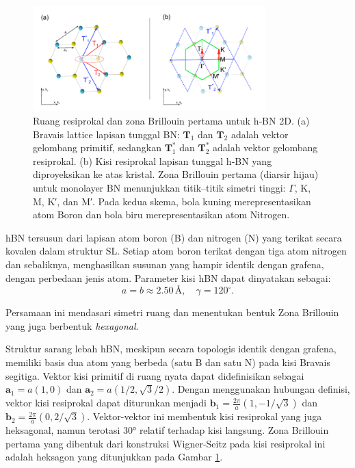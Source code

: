 \begin{figure}[ht]
    \centering
    \includegraphics[width=0.8\textwidth]{gambar/hBN_structure_brillouinzone}
    \caption{Ruang resiprokal dan zona Brillouin pertama untuk h‑BN 2D.
(a) Bravais lattice lapisan tunggal BN: $\mathbf{T}_1$ dan $\mathbf{T}_2$ adalah vektor gelombang primitif, sedangkan $\mathbf{T}_1^*$ dan $\mathbf{T}_2^*$ adalah vektor gelombang resiprokal.
(b) Kisi resiprokal lapisan tunggal h‑BN yang diproyeksikan ke atas kristal.
Zona Brillouin pertama (diarsir hijau) untuk monolayer BN menunjukkan titik–titik simetri tinggi: $\Gamma$, K, M, K′, dan M′.
Pada kedua skema, bola kuning merepresentasikan atom Boron dan bola biru merepresentasikan atom Nitrogen.
\citep{elias2020}}
    \label{fig:reciprocal_bz_hbn}
\end{figure}

hBN tersusun dari lapisan atom boron (B) dan nitrogen (N) yang terikat secara kovalen dalam struktur  SL. Setiap atom boron terikat dengan tiga atom nitrogen dan sebaliknya, menghasilkan susunan yang hampir identik dengan grafena, dengan perbedaan jenis atom. Parameter kisi hBN dapat dinyatakan sebagai:
\begin{equation}
a = b \approx 2.50 \, \text{\AA}, \quad \gamma = 120^\circ.
\end{equation}

Persamaan ini mendasari simetri ruang dan menentukan bentuk Zona Brillouin yang juga berbentuk \emph{hexagonal}.

Struktur sarang lebah hBN, meskipun secara topologis identik dengan grafena, memiliki basis dua atom yang berbeda (satu B dan satu N) pada kisi Bravais segitiga. Vektor kisi primitif di ruang nyata dapat didefinisikan sebagai $\mathbf{a}_1 = a(1, 0)$ dan $\mathbf{a}_2 = a(1/2, \sqrt{3}/2)$. Dengan menggunakan hubungan definisi, vektor kisi resiprokal dapat diturunkan menjadi $\mathbf{b}_1 = \frac{2\pi}{a}(1, -1/\sqrt{3})$ dan $\mathbf{b}_2 = \frac{2\pi}{a}(0, 2/\sqrt{3})$. Vektor-vektor ini membentuk kisi resiprokal yang juga heksagonal, namun terotasi 30° relatif terhadap kisi langsung. Zona Brillouin pertama yang dibentuk dari konstruksi Wigner-Seitz pada kisi resiprokal ini adalah heksagon yang ditunjukkan pada Gambar \ref{fig:reciprocal_bz_hbn}.

